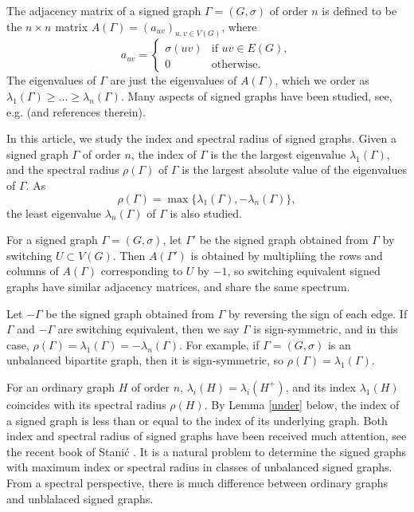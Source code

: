 \documentclass[12pt]{article}
\numberwithin{equation}{section}
\begin{document}
The adjacency matrix  of a signed graph $\Gamma=(G, \sigma)$ of order $n$ is defined to be the $n\times n$ matrix $A(\Gamma)=(a_{uv})_{u,v\in V(G)}$, where
\[
a_{uv}=\begin{cases} \sigma(uv) & \mbox{if $uv\in E(G)$},\\
0 & \mbox{otherwise}.
\end{cases}
\]
The eigenvalues of $\Gamma$ are just the eigenvalues of $A(\Gamma)$, which we order as  $\lambda_1(\Gamma)\ge \dots\ge\lambda_n(\Gamma)$. Many aspects of signed graphs have been studied, see, e.g. \cite{AL,StanB} (and references therein).



In this article, we study the index and spectral radius of signed graphs. Given a signed graph $\Gamma$ of order $n$, the index of $\Gamma$ is the the largest eigenvalue $\lambda_1(\Gamma)$,  and the spectral radius $\rho(\Gamma)$ of $\Gamma$ is the largest absolute value of the eigenvalues of $\Gamma$. As \[
\rho(\Gamma)=\max\{\lambda_1(\Gamma), -\lambda_n(\Gamma)\}, 
\] 
the least eigenvalue  $\lambda_n(\Gamma)$  of $\Gamma$ is also studied. 




For a signed graph $\Gamma=(G,\sigma)$, let $\Gamma'$ be the signed graph obtained from $\Gamma$ by switching  $U\subset V(G)$. Then $A(\Gamma')$ is obtained  by multipliing the rows and columns 
of $A(\Gamma)$ corresponding to $U$ by $-1$, so  switching equivalent signed graphs have similar adjacency matrices, and share the same spectrum.



Let $-\Gamma$ be the signed graph obtained from $\Gamma$ by reversing the sign of each edge.
If $\Gamma$ and $-\Gamma$ are switching equivalent, then we say $\Gamma$ is sign-symmetric, and in this case,
$\rho(\Gamma)=\lambda_1(\Gamma)=-\lambda_n(\Gamma)$.  For example, 
if $\Gamma=(G,\sigma)$ is an unbalanced bipartite graph, then it is sign-symmetric, so $\rho(\Gamma)=\lambda_1(\Gamma)$. 

For an ordinary graph $H$ of order $n$, $\lambda_i(H)=\lambda_i(H^+)$, and  its index $\lambda_1(H)$ coincides with its spectral radius $\rho(H)$. 
By 
Lemma \ref{under} below, the index of a signed graph is less than or equal to the index of its underlying graph. 
Both index and spectral radius of signed graphs have been received much attention, see the recent book of Stani\'c \cite{StanB}.  
It is a natural  problem  to determine the signed graphs with maximum index or spectral radius in  classes of unbalanced signed graphs.  From a spectral perspective, there is much difference between ordinary graphs and unblalaced signed graphs. 
\end{document}
